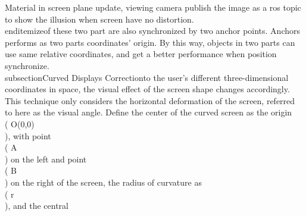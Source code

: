 Material in screen plane update, viewing camera publish the image as a ros topic to show the illusion when screen have no distortion.\n\\end{itemize}\n\nCoordinate of these two part are also synchronized by two anchor points. Anchors performs as two parts coordinates' origin. By this way, objects in two parts can use same relative coordinates, and get a better performance when position synchronize.\n\n\\subsection{Curved Displays Correction}\nAccording to the user's different three-dimensional coordinates in space, the visual effect of the screen shape changes accordingly. This technique only considers the horizontal deformation of the screen, referred to here as the visual angle. Define the center of the curved screen as the origin \\( O(0,0) \\), with point \\( A \\) on the left and point \\( B \\) on the right of the screen, the radius of curvature as \\( r \\), and the central 